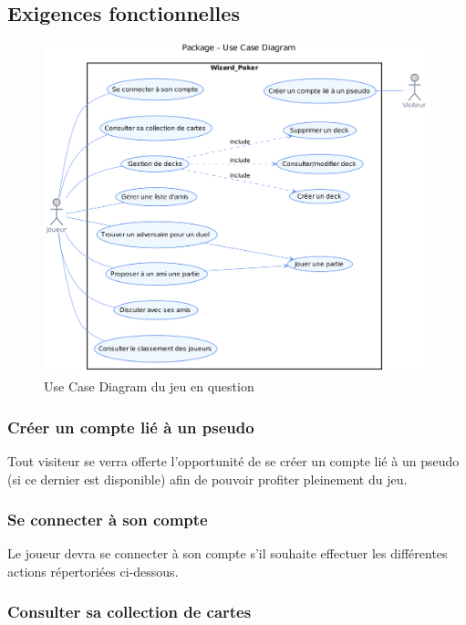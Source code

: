 \documentclass[11pt,a4paper]{article}
\begin{document}
\subsection{Exigences fonctionnelles}
\label{sec:exi-fonc}
\begin{figure}[ht]
  \centering
  \includegraphics[width=1\textwidth]{uml_files/UseCaseDiagram.png}
  \caption{\label{fig:usecase} Use Case Diagram du jeu en question}
\end{figure}

\subsubsection{Créer un compte lié à un pseudo}

Tout visiteur se verra offerte l'opportunité de se créer un compte
lié à un pseudo (si ce dernier est disponible) afin de pouvoir
profiter pleinement du jeu.

\subsubsection{Se connecter à son compte}

Le joueur devra se connecter à son compte s'il souhaite effectuer
les différentes actions répertoriées ci-dessous.

\subsubsection{Consulter sa collection de cartes}
\end{document}
